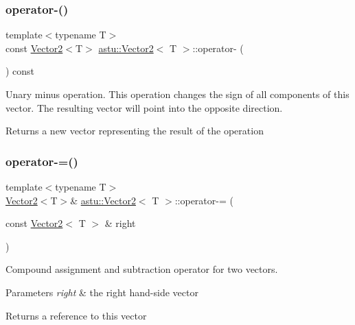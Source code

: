 \subsubsection{\texorpdfstring{operator-\/()}{operator-()}\hspace{0.1cm}{\footnotesize\ttfamily [2/2]}}
{\footnotesize\ttfamily template$<$typename T$>$ \\
const \hyperlink{classastu_1_1Vector2}{Vector2}$<$T$>$ \hyperlink{classastu_1_1Vector2}{astu\+::\+Vector2}$<$ T $>$\+::operator-\/ (\begin{DoxyParamCaption}{ }\end{DoxyParamCaption}) const\hspace{0.3cm}{\ttfamily [inline]}}

Unary minus operation. This operation changes the sign of all components of this vector. The resulting vector will point into the opposite direction.

\begin{DoxyReturn}{Returns}
a new vector representing the result of the operation 
\end{DoxyReturn}
\mbox{\label{classastu_1_1Vector2_a7022d1b830ee06d272a05d7d52c93a53}} 
\subsubsection{\texorpdfstring{operator-\/=()}{operator-=()}}
{\footnotesize\ttfamily template$<$typename T$>$ \\
\hyperlink{classastu_1_1Vector2}{Vector2}$<$T$>$\& \hyperlink{classastu_1_1Vector2}{astu\+::\+Vector2}$<$ T $>$\+::operator-\/= (\begin{DoxyParamCaption}\item[{const \hyperlink{classastu_1_1Vector2}{Vector2}$<$ T $>$ \&}]{right }\end{DoxyParamCaption})\hspace{0.3cm}{\ttfamily [inline]}}

Compound assignment and subtraction operator for two vectors.


\begin{DoxyParams}{Parameters}
{\em right} & the right hand-\/side vector \\
\hline
\end{DoxyParams}
\begin{DoxyReturn}{Returns}
a reference to this vector 
\end{DoxyReturn}
\mbox{\label{classastu_1_1Vector2_af2852a5bb5295f1a510e507bc554863d}} 
